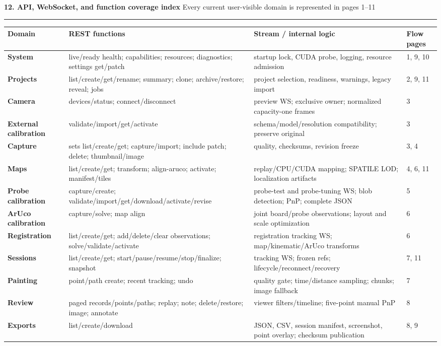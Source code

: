 \documentclass[10pt]{article}
\newcommand{\flowtitle}[2]{%
  {\LARGE\bfseries\color{navy} #1}\hfill{\small\color{slate} #2}\par\vspace{2mm}\hrule\vspace{3mm}}
\begin{document}
\flowtitle{12. API, WebSocket, and function coverage index}{Every current user-visible domain is represented in pages 1--11}
\small
\begin{tabularx}{\textwidth}{>{\bfseries}p{30mm} X X p{34mm}}
\toprule
Domain & REST functions & Stream / internal logic & Flow pages \\
\midrule
System & live/ready health; capabilities; resources; diagnostics; settings get/patch & startup lock, CUDA probe, logging, resource admission & 1, 9, 10 \\
Projects & list/create/get/rename; summary; clone; archive/restore; reveal; jobs & project selection, readiness, warnings, legacy import & 2, 9, 11 \\
Camera & devices/status; connect/disconnect & preview WS; exclusive owner; normalized capacity-one frames & 3 \\
External calibration & validate/import/get/activate & schema/model/resolution compatibility; preserve original & 3 \\
Capture & sets list/create/get; capture/import; include patch; delete; thumbnail/image & quality, checksums, revision freeze & 3, 4 \\
Maps & list/create/get; transform; align-aruco; activate; manifest/tiles & replay/CPU/CUDA mapping; SPATILE LOD; localization artifacts & 4, 6, 11 \\
Probe calibration & capture/create; validate/import/get/download/activate/revise & probe-test and probe-tuning WS; blob detection; PnP; complete JSON & 5 \\
ArUco calibration & capture/solve; map align & joint board/probe observations; layout and scale optimization & 6 \\
Registration & list/create/get; add/delete/clear observations; solve/validate/activate & registration tracking WS; map/kinematic/ArUco transforms & 6 \\
Sessions & list/create/get; start/pause/resume/stop/finalize; snapshot & tracking WS; frozen refs; lifecycle/reconnect/recovery & 7, 11 \\
Painting & point/path create; recent tracking; undo & quality gate; time/distance sampling; chunks; image fallback & 7 \\
Review & paged records/points/paths; replay; note; delete/restore; image; annotate & viewer filters/timeline; five-point manual PnP & 8 \\
Exports & list/create/download & JSON, CSV, session manifest, screenshot, point overlay; checksum publication & 8, 9 \\

\end{tabularx}
\end{document}
